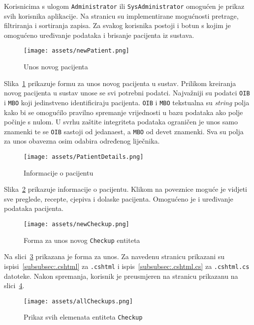 Korisnicima s ulogom \texttt{Administrator} ili \texttt{SysAdministrator} omogućen je prikaz svih korisnika aplikacije. Na stranicu su implementirane mogućnosti pretrage, filtriranja i sortiranja zapisa. Za svakog korisnika postoji i botun s kojim je omogućeno uređivanje podataka i brisanje pacijenta iz sustava.

\begin{figure}[H]
	\texttt{[image: assets/newPatient.png]}
	\centering
	\caption{Unos novog pacijenta}
	\label{fig:newPatient}
\end{figure}

Slika~\ref{fig:newPatient} prikazuje formu za unos novog pacijenta u sustav. Prilikom kreiranja novog pacijenta u sustav unose se svi potrebni podatci. Najvažniji su podatci \texttt{OIB} i \texttt{MBO} koji jedinstveno identificiraju pacijenta. \texttt{OIB} i \texttt{MBO} tekstualna su \textit{string} polja kako bi se omogućilo pravilno spremanje vrijednosti u bazu podataka ako polje počinje s nulom. U svrhu zaštite integriteta podataka ograničen je unos samo znamenki te se \texttt{OIB} sastoji od jedanaest, a \texttt{MBO} od devet znamenki. Sva su polja za unos obavezna osim odabira određenog liječnika. 

\begin{figure}[H]
	\texttt{[image: assets/PatientDetails.png]}
	\centering
	\caption{Informacije o pacijentu}
	\label{fig:patientDetails}
\end{figure}

Slika~\ref{fig:patientDetails} prikazuje informacije o pacijentu. Klikom na poveznice moguće je vidjeti sve preglede, recepte, cjepiva i dolaske pacijenta. Omogućeno je i uređivanje podataka pacijenta.

\begin{figure}[H]
	\texttt{[image: assets/newCheckup.png]}
	\centering
	\caption{Forma za unos novog \texttt{Checkup} entiteta}
	\label{fig:newCheckup}
\end{figure}

Na slici~\ref{fig:newCheckup} prikazana je forma za unos. Za navedenu stranicu prikazani su ispisi~\ref{subsubsec:.cshtml} za \texttt{.cshtml} i ispis~\ref{subsubsec:.cshtml.cs} za \texttt{.cshtml.cs} datoteke. Nakon spremanja, korisnik je preusmjeren na stranicu prikazanu na slici~\ref{fig:allCheckups}.

\begin{figure}[H]
	\texttt{[image: assets/allCheckups.png]}
	\centering
	\caption{Prikaz svih elemenata entiteta \texttt{Checkup}}
	\label{fig:allCheckups}
\end{figure}

